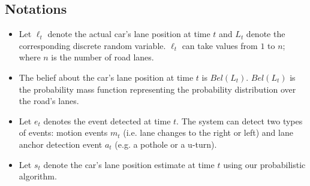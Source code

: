 \documentclass[10pt, conference, compsocconf]{IEEEtran}
\begin{document}
\subsection{Notations}
\begin{itemize}
\item Let $\ell_t$ denote the actual car's lane position at time $t$ and $L_t$ denote the corresponding discrete random variable. $\ell_t$ can take values from $1$ to $n$; where $n$ is the number of road lanes.
\item The belief about the car's lane position at time $t$ is $Bel(L_t)$. $Bel(L_t)$ is the probability mass function representing the probability distribution over the road's lanes. \item Let $e_t$ denotes the event detected at time $t$. The system can detect two types of events: motion events $m_t$ (i.e. lane changes to the right or left) and lane anchor detection event $a_t$ (e.g. a pothole or a u-turn).
\item Let $s_t$ denote the car's lane position estimate at time $t$ using our probabilistic algorithm.

\end{itemize}
\end{document}
